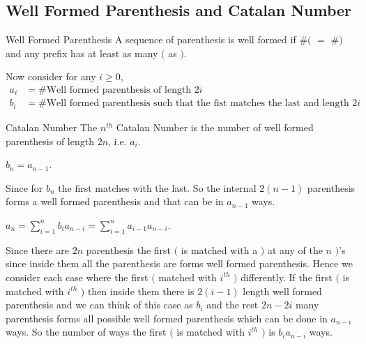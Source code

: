 \subsection{Well Formed Parenthesis and Catalan Number}
\begin{Definition}{Well Formed Parenthesis}{}
	A sequence of parenthesis is well formed if $\#($ $=$ $\#)$ and any prefix has at least as many $($ as $)$.
\end{Definition}
Now consider for any $i\geq 0$, \begin{align*}
	a_i&=\#\text{Well formed parenthesis of length $2i$}\\
	b_i&=\#\text{Well formed parenthesis such that the fist matches the last and length $2i$}
\end{align*}
\begin{Definition}{Catalan Number}{}
	The $n^{th}$ Catalan Number is the number of  well formed parenthesis of length $2n$, i.e. $a_i$. 
\end{Definition}
\begin{observation}
	$b_n=a_{n-1}$. 
\end{observation}
Since for $b_n$ the first matches with the last. So the internal $2(n-1)$ parenthesis forms a well formed parenthesis and that can be in $a_{n-1}$ ways.

\begin{observation}
	$a_n=\sum\limits_{i=1}^nb_ia_{n-i}=\sum\limits_{i=1}^n a_{i-1}a_{n-i}$. 
\end{observation}
Since there are $2n$ parenthesis the first $($ is matched with a $)$ at any of the  $n$ $)$'s since inside them all the parenthesis are forms well formed parenthesis. Hence we consider each case where the first $($ matched with $i^{th}$ $)$ differently. If the first $($ is matched with $i^{th}$ $)$ then inside them there is $2(i-1)$ length well formed parenthesis and we can think of this case as $b_i$ and the rest $2n-2i$ many parenthesis forms all possible well formed parenthesis which can be done in $a_{n-i}$ ways. So the number of ways the first $($ is matched with $i^{th}$ $)$ is $b_ia_{n-i}$ ways.  

